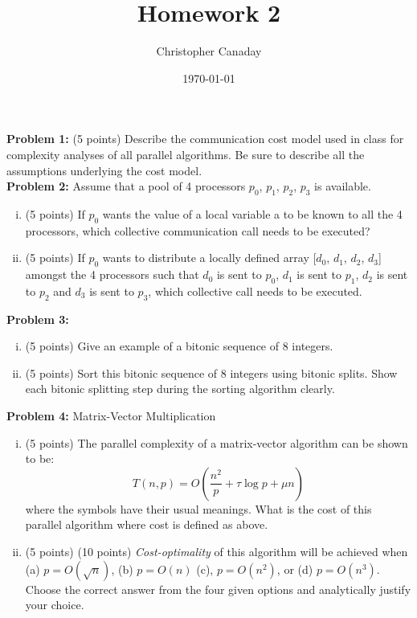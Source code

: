 \documentclass{article}
\title{Homework 2}
\author{Christopher Canaday}
\date{\today}
\begin{document}
    \maketitle
    \textbf{Problem 1:} (5 points) Describe the communication cost model used in class for complexity analyses of all
    parallel algorithms. Be sure to describe all the assumptions underlying the cost model. \hfill \\

    \textbf{Problem 2:} Assume that a pool of 4 processors {$p_{0}$, $p_{1}$, $p_{2}$, $p_{3}$} is available.
    \begin{enumerate}[i.]
    \item (5 points) If $p_{0}$ wants the value of a local variable a to be known to all the 4 processors, which collective
    communication call needs to be executed?

    \item (5 points) If $p_{0}$ wants to distribute a locally defined array [$d_{0}$, $d_{1}$, $d_{2}$, $d_{3}$] amongst the 4 processors such
that $d_{0}$ is sent to $p_{0}$, $d_{1}$ is sent to $p_{1}$, $d_{2}$ is sent to $p_{2}$ and $d_{3}$ is sent to $p_{3}$, which collective call needs to be
executed.
    \end{enumerate}
    
    \textbf{Problem 3:}
    \begin{enumerate}[i.]
    \item (5 points) Give an example of a bitonic sequence of 8 integers.

    \item (5 points) Sort this bitonic sequence of 8 integers using bitonic splits. Show each bitonic splitting step
    during the sorting algorithm clearly.
    \end{enumerate}

    \textbf{Problem 4:} Matrix-Vector Multiplication
    \begin{enumerate}[i.]
    \item (5 points) The parallel complexity of a matrix-vector algorithm can be shown to be:
    \begin{equation}
        T(n,p) = O(\frac{n^2}{p} + \tau\log{p}+\mu{n})
    \end{equation}
    where the symbols have their usual meanings. What is the cost of this parallel algorithm where cost is
defined as above.

    \item (5 points) (10 points) \textit{Cost-optimality} of this algorithm will be achieved when (a) $p = O(\sqrt{n})$, (b) $p = O(n)$ (c),
    $p = O(n^2)$, or (d) $p = O(n^3)$. Choose the correct answer from the four given options and analytically
    justify your choice.
    \end{enumerate}
\end{document}
